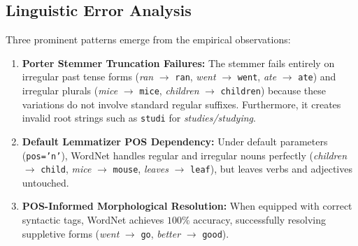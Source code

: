 \subsection{Linguistic Error Analysis}
Three prominent patterns emerge from the empirical observations:
\begin{enumerate}
    \item \textbf{Porter Stemmer Truncation Failures:} The stemmer fails entirely on irregular past tense forms (\textit{ran} $\to$ \texttt{ran}, \textit{went} $\to$ \texttt{went}, \textit{ate} $\to$ \texttt{ate}) and irregular plurals (\textit{mice} $\to$ \texttt{mice}, \textit{children} $\to$ \texttt{children}) because these variations do not involve standard regular suffixes. Furthermore, it creates invalid root strings such as \texttt{studi} for \textit{studies/studying}.
    \item \textbf{Default Lemmatizer POS Dependency:} Under default parameters (\texttt{pos='n'}), WordNet handles regular and irregular nouns perfectly (\textit{children} $\to$ \texttt{child}, \textit{mice} $\to$ \texttt{mouse}, \textit{leaves} $\to$ \texttt{leaf}), but leaves verbs and adjectives untouched.
    \item \textbf{POS-Informed Morphological Resolution:} When equipped with correct syntactic tags, WordNet achieves $100\%$ accuracy, successfully resolving suppletive forms (\textit{went} $\to$ \texttt{go}, \textit{better} $\to$ \texttt{good}).
\end{enumerate}

